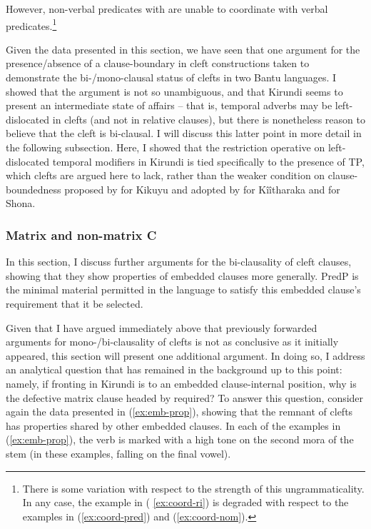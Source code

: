 \documentclass[12pt]{article}
\begin{document}
\noindent However, non-verbal predicates with  are unable to coordinate with verbal predicates.\footnote{There is some variation with respect to the strength of this ungrammaticality. In any case, the example in ( \ref{ex:coord-ri}) is degraded with respect to the examples in (\ref{ex:coord-pred}) and (\ref{ex:coord-nom}).}

\bex
\ex{}\bxl
{} \label{ex:coord-ni}
\fxl
\fex

Given the data presented in this section, we have seen that one argument for the presence/absence of a clause-boundary in cleft constructions taken to demonstrate the bi-/mono-clausal status of clefts in two Bantu languages. I showed that the argument is not so unambiguous, and that Kirundi seems to present an intermediate state of affairs -- that is, temporal adverbs may be left-dislocated in clefts (and not in relative clauses), but there is nonetheless reason to believe that the cleft is bi-clausal. I will discuss this latter point in more detail in the following subsection.  Here, I showed that the restriction operative on left-dislocated temporal modifiers in Kirundi is tied specifically to the presence of TP, which clefts are argued here to lack, rather than the weaker condition on clause-boundedness proposed by \citet[p. 80]{fschwarz-2003} for Kikuyu and adopted by \citet{abels-muriungi-2008} for Kîîtharaka and \citet{zentz-2016} for Shona.

\subsubsection{Matrix and non-matrix C} \label{sec:matrix-c}

In this section, I discuss further arguments for the bi-clausality of cleft clauses, showing that they show properties of embedded clauses more generally. PredP is the minimal material permitted in the language to satisfy this embedded clause's requirement that it be selected. 

Given that I have argued immediately above that previously forwarded arguments for mono-/bi-clausality of clefts is not as conclusive as it initially appeared, this section will present one additional argument. In doing so, I address an analytical question that has remained in the background up to this point: namely, if fronting in Kirundi is to an embedded clause-internal position, why is the defective matrix clause headed by  required? To answer this question, consider again the data presented in (\ref{ex:emb-prop}), showing that the remnant of clefts has properties shared by other embedded clauses. In each of the examples in (\ref{ex:emb-prop}), the verb is marked with a high tone on the second mora of the stem (in these examples, falling on the final vowel).
\end{document}
